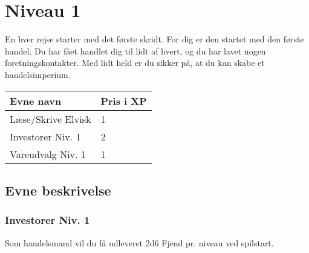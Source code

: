 \chapter*{Niveau 1}
En hver rejse starter med det første skridt. For dig er den startet med den første handel. Du har fået handlet dig til lidt af hvert, og du har lavet nogen foretningskontakter. Med lidt held er du sikker på, at du kan skabe et handelsimperium.

\begin{table}[H]
    \centering
    \begin{tabular}{|p{}|p{}|}
    \rowcolor{cerulean!80}\hline
        Evne navn & Pris i XP \\\hline
         Læse/Skrive Elvisk & 1\\\hline
         Investorer Niv. 1 & 2 \\\hline
         Vareudvalg Niv. 1 & 1 \\\hline
    \end{tabular}
\end{table}

\section*{Evne beskrivelse}




\subsection*{Investorer Niv. 1}
Som handelsmand vil du få udleveret 2d6 Fjend pr. niveau ved spilstart.\\

